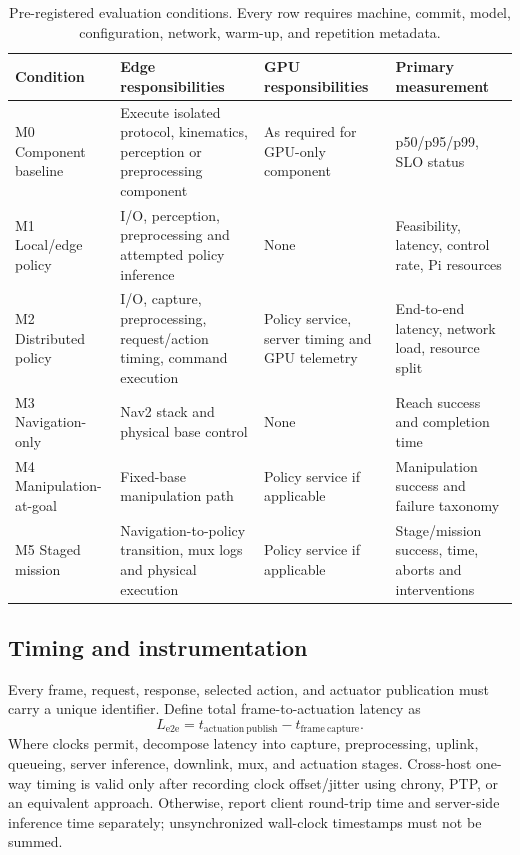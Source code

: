 \documentclass[letterpaper,10pt,conference]{ieeeconf}
\begin{document}
\begin{table}[t]
\caption{Pre-registered evaluation conditions. Every row requires machine, commit, model, configuration, network, warm-up, and repetition metadata.}
\label{tab:conditions}
\centering
\small
\begin{tabularx}{\textwidth}{l X X X}
\toprule
Condition & Edge responsibilities & GPU responsibilities & Primary measurement \\
\midrule
M0 Component baseline & Execute isolated protocol, kinematics, perception or preprocessing component & As required for GPU-only component & p50/p95/p99, SLO status \\
M1 Local/edge policy & I/O, perception, preprocessing and attempted policy inference & None & Feasibility, latency, control rate, Pi resources \\
M2 Distributed policy & I/O, capture, preprocessing, request/action timing, command execution & Policy service, server timing and GPU telemetry & End-to-end latency, network load, resource split \\
M3 Navigation-only & Nav2 stack and physical base control & None & Reach success and completion time \\
M4 Manipulation-at-goal & Fixed-base manipulation path & Policy service if applicable & Manipulation success and failure taxonomy \\
M5 Staged mission & Navigation-to-policy transition, mux logs and physical execution & Policy service if applicable & Stage/mission success, time, aborts and interventions \\
\bottomrule
\end{tabularx}
\end{table}

\subsection{Timing and instrumentation}

Every frame, request, response, selected action, and actuator publication must carry a unique identifier. Define total frame-to-actuation latency as
\begin{equation}
L_{\mathrm{e2e}} = t_{\mathrm{actuation\ publish}} - t_{\mathrm{frame\ capture}}.
\end{equation}
Where clocks permit, decompose latency into capture, preprocessing, uplink, queueing, server inference, downlink, mux, and actuation stages. Cross-host one-way timing is valid only after recording clock offset/jitter using chrony, PTP, or an equivalent approach. Otherwise, report client round-trip time and server-side inference time separately; unsynchronized wall-clock timestamps must not be summed.
\end{document}

